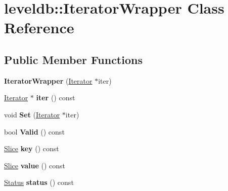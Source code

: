 \hypertarget{classleveldb_1_1_iterator_wrapper}{}\section{leveldb\+::Iterator\+Wrapper Class Reference}
\label{classleveldb_1_1_iterator_wrapper}
\subsection*{Public Member Functions}
\begin{DoxyCompactItemize}
\item 
\mbox{\label{classleveldb_1_1_iterator_wrapper_ab4714f21809e357b4d5b6bdbec4fe98f}} 
{\bfseries Iterator\+Wrapper} (\mbox{\hyperlink{classleveldb_1_1_iterator}{Iterator}} $\ast$iter)
\item 
\mbox{\label{classleveldb_1_1_iterator_wrapper_a6fa1f15e4db874e01569b3953bf16624}} 
\mbox{\hyperlink{classleveldb_1_1_iterator}{Iterator}} $\ast$ {\bfseries iter} () const
\item 
\mbox{\label{classleveldb_1_1_iterator_wrapper_ae14dd8ac682dd596ba2a3d2407e1a4fd}} 
void {\bfseries Set} (\mbox{\hyperlink{classleveldb_1_1_iterator}{Iterator}} $\ast$iter)
\item 
\mbox{\label{classleveldb_1_1_iterator_wrapper_a4567a75f45c4e68d5b7336a31078e1a7}} 
bool {\bfseries Valid} () const
\item 
\mbox{\label{classleveldb_1_1_iterator_wrapper_a25e25f8abc95c67bf36dbe623fc869f0}} 
\mbox{\hyperlink{classleveldb_1_1_slice}{Slice}} {\bfseries key} () const
\item 
\mbox{\label{classleveldb_1_1_iterator_wrapper_a4030cdddd52a5b22f1e6144b1262efa7}} 
\mbox{\hyperlink{classleveldb_1_1_slice}{Slice}} {\bfseries value} () const
\item 
\mbox{\label{classleveldb_1_1_iterator_wrapper_a2f2b4510251ac93391ff38bcc41c312c}} 
\mbox{\hyperlink{classleveldb_1_1_status}{Status}} {\bfseries status} () const

\end{DoxyCompactItemize}
